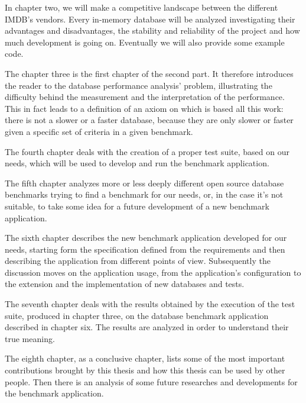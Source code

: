 In chapter two, we will make a competitive landscape between the different IMDB's vendors. Every in-memory database will be analyzed investigating their advantages and disadvantages, the stability and reliability of the project and how much development is going on. Eventually we will also provide some example code.

The chapter three is the first chapter of the second part. It therefore introduces the reader to the database performance analysis' problem, illustrating the difficulty behind the measurement and the interpretation of the performance. This in fact leads to a definition of an axiom on which is based all this work: there is not a slower or a faster database, because they are only slower or faster given a specific set of criteria in a given benchmark.

The fourth chapter deals with the creation of a proper test suite, based on our needs, which will be used to develop and run the benchmark application.

The fifth chapter analyzes more or less deeply different open source database benchmarks trying to find a benchmark for our needs, or, in the case it's not suitable, to take some idea for a future development of a new benchmark application.

The sixth chapter describes the new benchmark application developed for our needs, starting form the specification defined from the requirements and then describing the application from different points of view. Subsequently the discussion moves on the application usage, from the application's configuration to the extension and the implementation of new databases and tests.

The seventh chapter deals with the results obtained by the execution of the test suite, produced in chapter three, on the database benchmark application described in chapter six. The results are analyzed in order to understand their true meaning.

The eighth chapter, as a conclusive chapter, lists some of the most important contributions brought by this thesis and how this thesis can be used by other people. Then there is an analysis of some future researches and developments for the benchmark application.